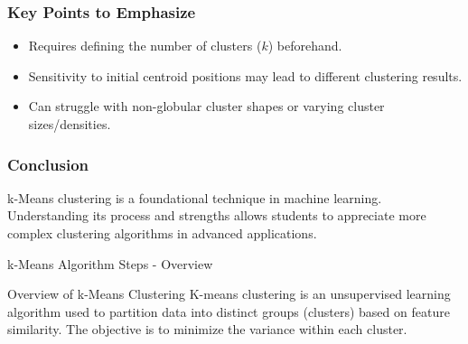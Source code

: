 \documentclass[aspectratio=169]{beamer}
\begin{document}
\begin{frame}[fragile]
    \frametitle{Key Points to Emphasize}
    \begin{itemize}
        \item Requires defining the number of clusters ($k$) beforehand.
        \item Sensitivity to initial centroid positions may lead to different clustering results.
        \item Can struggle with non-globular cluster shapes or varying cluster sizes/densities.
    \end{itemize}
\end{frame}

\begin{frame}[fragile]
    \frametitle{Conclusion}
    k-Means clustering is a foundational technique in machine learning. Understanding its process and strengths allows students to appreciate more complex clustering algorithms in advanced applications.
\end{frame}

\begin{frame}[fragile]{k-Means Algorithm Steps - Overview}
    \begin{block}{Overview of k-Means Clustering}
        K-means clustering is an unsupervised learning algorithm used to partition data into distinct groups (clusters) based on feature similarity. The objective is to minimize the variance within each cluster.
    \end{block}
\end{frame}
\end{document}
